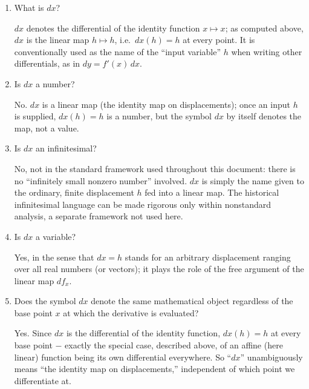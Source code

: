 \documentclass{essay}
\begin{document}
\begin{enumerate}[resume, leftmargin=*, itemsep=8pt]

\item What is \(dx\)?
\begin{answer}
\(dx\) denotes the differential of the identity function \(x\mapsto x\); as computed above, \(dx\) is the linear map \(h\mapsto h\), i.e.\ \(dx(h)=h\) at every point. It is conventionally used as the name of the ``input variable'' \(h\) when writing other differentials, as in \(dy=f'(x)\,dx\).
\end{answer}

\item Is \(dx\) a number?
\begin{answer}
No. \(dx\) is a linear map (the identity map on displacements); once an input \(h\) is supplied, \(dx(h)=h\) is a number, but the symbol \(dx\) by itself denotes the map, not a value.
\end{answer}

\item Is \(dx\) an infinitesimal?
\begin{answer}
No, not in the standard framework used throughout this document: there is no ``infinitely small nonzero number'' involved. \(dx\) is simply the name given to the ordinary, finite displacement \(h\) fed into a linear map. The historical infinitesimal language can be made rigorous only within nonstandard analysis, a separate framework not used here.
\end{answer}

\item Is \(dx\) a variable?
\begin{answer}
Yes, in the sense that \(dx=h\) stands for an arbitrary displacement ranging over all real numbers (or vectors); it plays the role of the free argument of the linear map \(df_x\).
\end{answer}

\item Does the symbol \(dx\) denote the same mathematical object regardless of the base point \(x\) at which the derivative is evaluated?
\begin{answer}
Yes. Since \(dx\) is the differential of the identity function, \(dx(h)=h\) at every base point \(-\) exactly the special case, described above, of an affine (here linear) function being its own differential everywhere. So ``\(dx\)'' unambiguously means ``the identity map on displacements,'' independent of which point we differentiate at.
\end{answer}


\end{enumerate}
\end{document}
